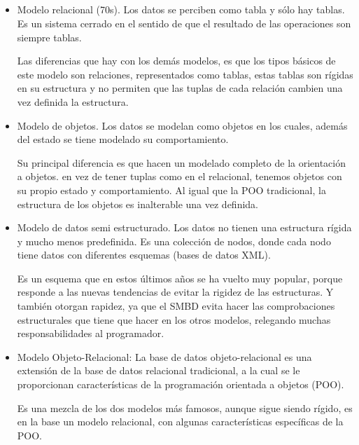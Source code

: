 \documentclass{article}
\begin{document}
\subsection{}
\begin{itemize}
    \item Modelo relacional (70s). Los datos se perciben como tabla y sólo hay
    tablas. Es un sistema cerrado en el sentido de que el resultado de las operaciones son siempre tablas.\\\par 
    Las diferencias que hay con los demás modelos, es que los tipos básicos de este modelo son relaciones, representados como tablas, estas tablas son rígidas en su estructura y no permiten que las tuplas de cada relación cambien una vez definida la estructura.
    \item  Modelo de objetos. Los datos se modelan como objetos en los cuales, además del estado se tiene modelado su comportamiento.\\\par 
    Su principal diferencia es que hacen un modelado completo de la orientación a objetos. en vez de tener tuplas como en el relacional, tenemos objetos con su propio estado y comportamiento. Al igual que la POO tradicional, la estructura de los objetos es inalterable una vez definida.
    
    \item  Modelo de datos semi estructurado. Los datos no tienen una estructura rígida y mucho menos predefinida. Es una colección de nodos, donde cada nodo tiene datos con diferentes esquemas (bases de datos XML).\\\par
    Es un esquema que en estos últimos años se ha vuelto muy popular, porque responde a las nuevas tendencias de evitar la rigidez de las estructuras. Y también otorgan rapidez, ya que el SMBD evita hacer las comprobaciones estructurales que tiene que hacer en los otros modelos, relegando muchas responsabilidades al programador.
    \item  Modelo Objeto-Relacional: La base de datos objeto-relacional es una extensión de la base de datos relacional tradicional, a la cual se le proporcionan características de la programación orientada a objetos (POO).
    \\\par 
    Es una mezcla de los dos modelos más famosos, aunque sigue siendo rígido, es en la base un modelo relacional, con algunas características específicas de la POO.
    \end{itemize}
\end{document}
